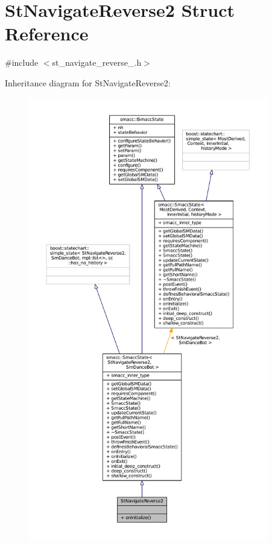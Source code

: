 \hypertarget{structStNavigateReverse2}{}\section{St\+Navigate\+Reverse2 Struct Reference}
\label{structStNavigateReverse2}


{\ttfamily \#include $<$st\+\_\+navigate\+\_\+reverse\+\_.\+h$>$}



Inheritance diagram for St\+Navigate\+Reverse2\+:
\nopagebreak
\begin{figure}[H]
\begin{center}
\leavevmode
\includegraphics[height=550pt]{structStNavigateReverse2__inherit__graph}
\end{center}
\end{figure}


